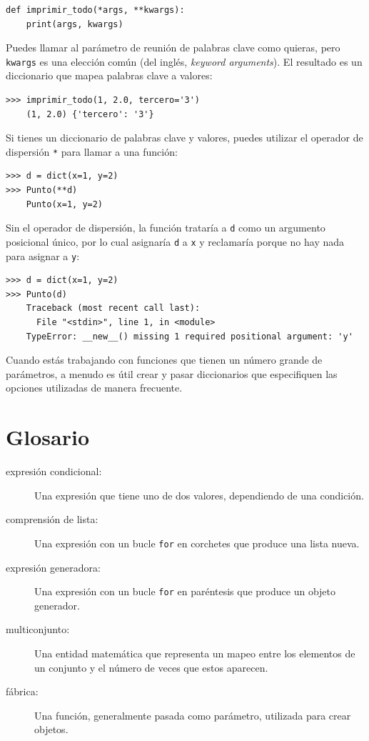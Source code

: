 \documentclass[10pt]{book}
\begin{document}
\begin{verbatim}
def imprimir_todo(*args, **kwargs):
    print(args, kwargs)
\end{verbatim}
%
Puedes llamar al parámetro de reunión de palabras clave como quieras, pero
{\tt kwargs} es una elección común (del inglés, {\em keyword arguments}).  El resultado es un diccionario que mapea
palabras clave a valores:

\begin{verbatim}
>>> imprimir_todo(1, 2.0, tercero='3')
    (1, 2.0) {'tercero': '3'}
\end{verbatim}
%
Si tienes un diccionario de palabras clave y valores, puedes utilizar el
operador de dispersión {\tt **} para llamar a una función:

\begin{verbatim}
>>> d = dict(x=1, y=2)
>>> Punto(**d)
    Punto(x=1, y=2)
\end{verbatim}
%
Sin el operador de dispersión, la función trataría a {\tt d} como
un argumento posicional único, por lo cual asignaría {\tt d} a
{\tt x} y reclamaría porque no hay nada para asignar a {\tt y}:

\begin{verbatim}
>>> d = dict(x=1, y=2)
>>> Punto(d)
    Traceback (most recent call last):
      File "<stdin>", line 1, in <module>
    TypeError: __new__() missing 1 required positional argument: 'y'
\end{verbatim}
%
Cuando estás trabajando con funciones que tienen un número grande de
parámetros, a menudo es útil crear y pasar diccionarios
que especifiquen las opciones utilizadas de manera frecuente.


\section{Glosario}

\begin{description}

\item[expresión condicional:] Una expresión que tiene uno de dos
valores, dependiendo de una condición.

\item[comprensión de lista:] Una expresión con un bucle {\tt for} en
corchetes que produce una lista nueva.

\item[expresión generadora:] Una expresión con un bucle {\tt for} en paréntesis
que produce un objeto generador.

\item[multiconjunto:] Una entidad matemática que representa un mapeo
entre los elementos de un conjunto y el número de veces que estos aparecen.

\item[fábrica:] Una función, generalmente pasada como parámetro, utilizada para
crear objetos.

\end{description}
\end{document}
